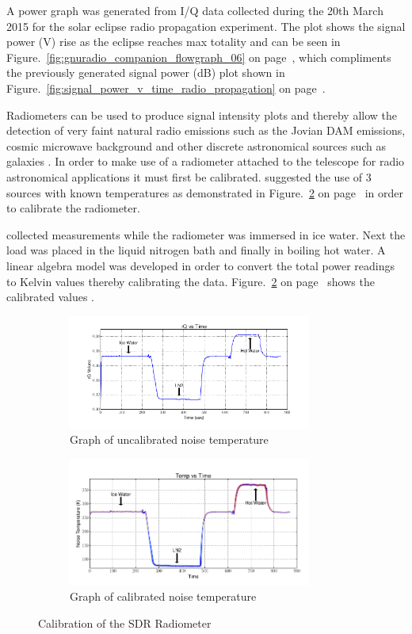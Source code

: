 A power graph was generated from I/Q data collected during the 20th March 2015 for the solar eclipse radio propagation experiment. The plot shows the signal power (V) rise as the eclipse reaches max totality and can be seen in Figure.~\ref{fig:gnuradio_companion_flowgraph_06} on page~\pageref{fig:gnuradio_companion_flowgraph_06}, which compliments the previously generated signal power (dB) plot shown in Figure.~\ref{fig:signal_power_v_time_radio_propagation} on page~\pageref{fig:signal_power_v_time_radio_propagation}.

Radiometers can be used to produce signal intensity plots and thereby allow the detection of very faint natural radio emissions such as the Jovian \gls{DAM} emissions, cosmic microwave background and other discrete astronomical sources such as galaxies \citep{nrao-10}. In order to make use of a radiometer attached to the telescope for radio astronomical applications it must first be calibrated. \cite{nelson-15} suggested the use of 3 sources with known temperatures as demonstrated in Figure.~\ref{fig:calibrated_radiometer} on page~\pageref{fig:calibrated_radiometer} in order to calibrate the radiometer.

\citet{nelson-15} collected measurements while the radiometer was immersed in ice water. Next the load was placed in the liquid nitrogen bath and finally in boiling hot water. A linear algebra model was developed in order to convert the total power readings to Kelvin values thereby calibrating the data. Figure.~\ref{fig:calibrated_radiometer} on page~\pageref{fig:calibrated_radiometer} shows the calibrated values \citep{nelson-15}.

%
\begin{figure}	
	\centering
	\begin{subfigure}[t]{8cm}
		\centering
		\includegraphics[width=8cm]{images/89}
		\caption{Graph of uncalibrated noise temperature \citep{nelson-15}}
		\label{fig:uncalibrated_radiometer} 
	\end{subfigure}
	\quad
	\begin{subfigure}[t]{8cm}
		\centering
		\includegraphics[width=8cm]{images/87}
		\caption{Graph of calibrated noise temperature \citep{nelson-15}}
		\label{fig:calibrated_radiometer}
	\end{subfigure}
	\caption{Calibration of the SDR Radiometer}
	\label{fig:sdr_radiometer_calibration}
\end{figure}
%


